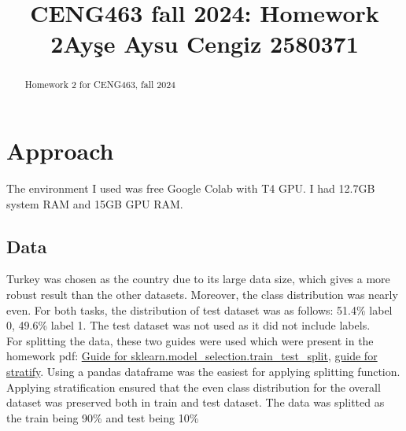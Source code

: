 \documentclass[
]{ceurart}
\begin{document}

\title{CENG463 fall 2024: Homework 2}

\title[mode=sub]{Ayşe Aysu Cengiz 2580371}




\begin{abstract}
Homework 2 for CENG463, fall 2024
\end{abstract}


\maketitle

\section{Approach}

The environment I used was free Google Colab with T4 GPU. I had 12.7GB system RAM and 15GB GPU RAM.
\subsection{Data}
Turkey was chosen as the country due to its large data size, which gives a more robust result than the other datasets. Moreover, the class distribution was nearly even. For both tasks, the distribution of test dataset was as follows: 51.4\% label 0, 49.6\% label 1. The test dataset was not used as it did not include labels.\\

For splitting the data, these two guides were used which were present in the homework pdf: \href{https://scikit-learn.org/1.5/modules/generated/sklearn.model_selection.train_test_split.html}{Guide for sklearn.model\_selection.train\_test\_split}, 
\href{https://stackoverflow.com/questions/34842405/parameter-stratify-from-method-train-test-split-scikit-learn}{guide for stratify}. Using a pandas dataframe was the easiest for applying splitting function. Applying stratification ensured that the even class distribution for the overall dataset was  preserved both in train and test dataset. The data was splitted as the train being 90\% and test being 10\%
\end{document}

